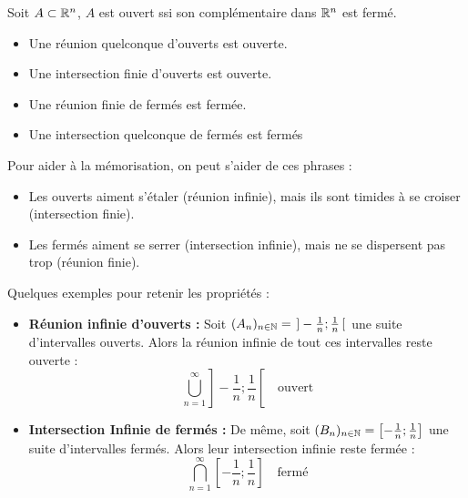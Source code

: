 \begin{proposition}
    Soit $A \subset \mathbb{R}^n$, $A$ est ouvert ssi son complémentaire dans $\mathbb{R}^n$ est fermé. 
\end{proposition}

\begin{prop}
    \begin{itemize}
        \item Une réunion quelconque d'ouverts est ouverte.
        \item Une intersection finie d'ouverts est ouverte.
        \item Une réunion finie de fermés est fermée.
        \item Une intersection quelconque de fermés est fermés
    \end{itemize}
\end{prop}

\begin{remark}
    Pour aider à la mémorisation, on peut s'aider de ces phrases :
    \begin{itemize}
        \item Les ouverts aiment s’étaler (réunion infinie), mais ils sont timides à se croiser (intersection finie).
        \item Les fermés aiment se serrer (intersection infinie), mais ne se dispersent pas trop (réunion finie).
    \end{itemize}
\end{remark}

\begin{example}
    Quelques exemples pour retenir les propriétés :
    \begin{itemize}
        \item \textbf{Réunion infinie d'ouverts : } Soit $(A_n)_{n \in \mathbb{N}} = \left. \right] -\frac{1}{n}; \frac{1}{n} \left[ \right. $ une suite d'intervalles ouverts. 
        Alors la réunion infinie de tout ces intervalles reste ouverte :
            \[ \bigcup_{n = 1}^\infty  \left. \right] -\frac{1}{n}; \frac{1}{n} \left[ \right.  \quad \text{ouvert}\] 
        \item \textbf{Intersection Infinie de fermés : } De même, soit $(B_n)_{n \in \mathbb{N}} =  \left[-\frac{1}{n}; \frac{1}{n} \right]$
        une suite d'intervalles fermés. Alors leur intersection infinie reste fermée :
            \[ \bigcap_{n = 1}^\infty  \left[-\frac{1}{n}; \frac{1}{n} \right] \quad \text{fermé}\]
    \end{itemize}
\end{example}

